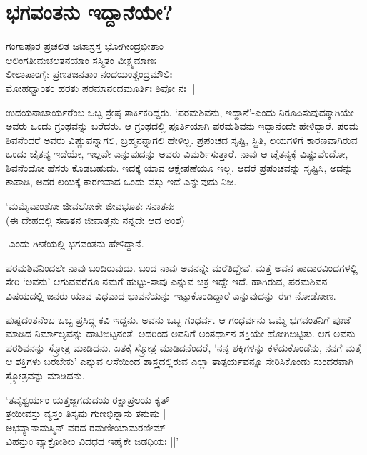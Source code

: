 \chapter{ಭಗವಂತನು ಇದ್ದಾನೆಯೇ?}\label{chap8}

\begin{shloka}
ಗಂಗಾಪೂರ ಪ್ರಚಲಿತ ಜಟಾಸ್ರಸ್ತ ಭೋಗೀಂದ್ರಭೀತಾಂ\\
ಆಲಿಂಗತೀಮಚಲತನಯಾಂ ಸಸ್ಮಿತಂ ವೀಕ್ಷ್ಯಮಾಣಃ |\\
ಲೀಲಾಪಾಂಗೈಃ ಪ್ರಣತಜನತಾಂ ನಂದಯಂಶ್ಚಂದ್ರಮೌಲಿಃ\\
ಮೋಹಧ್ವಾಂತಂ ಹರತು ಪರಮಾನಂದಮೂರ್ತಿಃ ಶಿವೋ ನಃ‌ ||
\end{shloka}

ಉದಯನಾಚಾರ್ಯರೆಂಬ ಒಬ್ಬ ಶ್ರೇಷ್ಠ ತಾರ್ಕಿಕರಿದ್ದರು. `ಪರಮಶಿವನು, ಇದ್ದಾನೆ'-ಎಂದು ನಿರೂಪಿಸುವುದಕ್ಕಾಗಿಯೇ ಅವರು ಒಂದು ಗ್ರಂಥವನ್ನು ಬರೆದರು. ಆ ಗ್ರಂಥದಲ್ಲಿ ಪೂರ್ತಿಯಾಗಿ ಪರಮಶಿವನು ಇದ್ದಾನೆಂದೇ ಹೇಳಿದ್ದಾರೆ. ಪರಮ ಶಿವನೆಂದರೆ ಅವರು ವಿಷ್ಣುವನ್ನಾಗಲಿ, ಬ್ರಹ್ಮನನ್ನಾಗಲಿ ಹೇಳಿಲ್ಲ. ಪ್ರಪಂಚದ ಸೃಷ್ಟಿ, ಸ್ಥಿತಿ, ಲಯಗಳಿಗೆ ಕಾರಣವಾಗಿರುವ ಒಂದು ಚೈತನ್ಯ ಇದೆಯೇ, ಇಲ್ಲವೇ ಎನ್ನುವುದನ್ನು ಅವರು ವಿಮರ್ಶಿಸುತ್ತಾರೆ. ನಾವು ಆ ಚೈತನ್ಯಕ್ಕೆ ವಿಷ್ಣುವೆಂದೋ, ಶಿವನೆಂದೋ ಹೆಸರು ಕೊಡಬಹುದು. ಇದಕ್ಕೆ ಯಾವ ಆಕ್ಷೇಪಣೆಯೂ ಇಲ್ಲ. ಆದರೆ ಪ್ರಪಂಚವನ್ನು ಸೃಷ್ಟಿಸಿ, ಅದನ್ನು ಕಾಪಾಡಿ, ಅದರ ಲಯಕ್ಕೆ ಕಾರಣವಾದ ಒಂದು ವಸ್ತು ಇದೆ ಎನ್ನುವುದು ನಿಜ.

\begin{shloka}
`ಮಮೈವಾಂಶೋ ಜೀವಲೋಕೇ ಜೀವಭೂತಃ ಸನಾತನಃ\\
(ಈ ದೇಹದಲ್ಲಿ ಸನಾತನ ಜೀವಾತ್ಮನು ನನ್ನದೇ ಆದ ಅಂಶ)
\end{shloka}

-ಎಂದು ಗೀತೆಯಲ್ಲಿ ಭಗವಂತನು ಹೇಳಿದ್ದಾನೆ.

ಪರಮಶಿವನಿಂದಲೇ ನಾವು ಬಂದಿರುವುದು. ಬಂದ ನಾವು ಅವನನ್ನೇ ಮರೆತಿದ್ದೇವೆ. ಮತ್ತೆ ಅವನ ಪಾದಾರವಿಂದಗಳಲ್ಲಿ ಸೇರಿ `ಅವನು' ಆಗುವವರೆಗೂ ನಮಗೆ ಹುಟ್ಟು-ಸಾವು ಎನ್ನುವ ಚಕ್ರ ಇದ್ದೇ ಇದೆ. ಹಾಗಿರುವ, ಪರಮಶಿವನ ವಿಷಯದಲ್ಲಿ ಜನರು ಯಾವ ವಿಧವಾದ ಭಾವನೆಯನ್ನು ಇಟ್ಟುಕೊಂಡಿದ್ದಾರೆ ಎನ್ನುವುದನ್ನು ಈಗ ನೋಡೋಣ.

ಪುಷ್ಪದಂತನೆಂಬ ಒಬ್ಬ ಪ್ರಸಿದ್ಧ ಕವಿ ಇದ್ದನು. ಅವನು ಒಬ್ಬ ಗಂಧರ್ವ. ಆ ಗಂಧರ್ವನು ಒಮ್ಮೆ ಭಗವಂತನಿಗೆ ಪೂಜೆ ಮಾಡಿದ ನಿರ್ಮಾಲ್ಯವನ್ನು ದಾಟಿಬಿಟ್ಟನಂತೆ. ಅದರಿಂದ ಅವನಿಗೆ ಅಂತರ್ಧಾನ ಶಕ್ತಿಯೇ ಹೋಗಿಬಿಟ್ಟಿತು. ಆಗ ಅವನು ಪರಶಿವನನ್ನು ಸ್ತ್ರೋತ್ರ ಮಾಡಿದನು. ಏತಕ್ಕೆ ಸ್ತ್ರೋತ್ರ ಮಾಡಿದನೆಂದರೆ, `ನನ್ನ ಶಕ್ತಿಗಳನ್ನು ಕಳೆದುಕೊಂಡೆನು, ನನಗೆ ಮತ್ತೆ ಆ ಶಕ್ತಿಗಳು ಬರಬೇಕು' ಎನ್ನುವ ಆಸೆಯಿಂದ ಶಾಸ್ತ್ರದಲ್ಲಿರುವ ಎಲ್ಲಾ ತಾತ್ಪರ್ಯವನ್ನೂ ಸೇರಿಸಿಕೊಂಡು ಸುಂದರವಾಗಿ ಸ್ತ್ರೋತ್ರವನ್ನು ಮಾಡಿದನು.

\begin{shloka}
`ತವೈಶ್ವರ್ಯಂ ಯತ್ತಜ್ಜಗದುದಯ ರಕ್ಷಾಪ್ರಲಯ ಕೃತ್\\
ತ್ರಯೀವಸ್ತು ವ್ಯಸ್ತಂ ತಿಸೃಷು ಗುಣಭಿನ್ನಾಸು ತನುಷು |\\
ಅಭವ್ಯಾನಾಮಸ್ಮಿನ್ ವರದ ರಮಣೀಯಾಮರಣೀಮ್\\
ವಿಹನ್ತುಂ ವ್ಯಾಕ್ರೋಶೀಂ ವಿದಧಥ ಇಹೈಕೇ ಜಡಧಿಯಃ ||'
\end{shloka}

